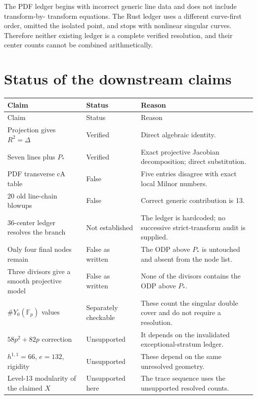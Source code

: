 \documentclass[11pt]{article}
\newcommand{\wrong}[1]{\textcolor{mistakered}{#1}}
\begin{document}
The PDF ledger begins with incorrect generic line data and does not include transform-by-
transform equations.  The Rust ledger uses a different curve-first order, omitted the
isolated point, and stops with nonlinear singular curves.  Therefore neither existing ledger
is a complete verified resolution, and their center counts cannot be combined arithmetically.

\section{Status of the downstream claims}

\renewcommand{\arraystretch}{1.18}
\begin{longtable}{@{}p{}p{}p{}@{}}
\toprule
Claim & Status & Reason \\
\midrule
\endfirsthead
\toprule
Claim & Status & Reason \\
\midrule
\endhead
Projection gives $R^2=\Delta$ & Verified & Direct algebraic identity. \\
Seven lines plus $P_*$ & Verified & Exact projective Jacobian decomposition; direct substitution. \\
PDF transverse cA table & \wrong{False} & Five entries disagree with exact local Milnor numbers. \\
20 old line-chain blowups & \wrong{False} & Correct generic contribution is 13. \\
36-center ledger resolves the branch & \wrong{Not established} & The ledger is hardcoded; no successive strict-transform audit is supplied. \\
Only four final nodes remain & \wrong{False as written} & The ODP above $P_*$ is untouched and absent from the node list. \\
Three divisors give a smooth projective model & \wrong{False as written} & None of the divisors contains the ODP above $P_*$. \\
$\#Y_0(\mathbb F_p)$ values & Separately checkable & These count the singular double cover and do not require a resolution. \\
$58p^2+82p$ correction & \wrong{Unsupported} & It depends on the invalidated exceptional-stratum ledger. \\
$h^{1,1}=66$, $e=132$, rigidity & \wrong{Unsupported} & These depend on the same unresolved geometry. \\
Level-13 modularity of the claimed $X$ & \wrong{Unsupported here} & The trace sequence uses the unsupported resolved counts. \\
\bottomrule
\end{longtable}
\end{document}
